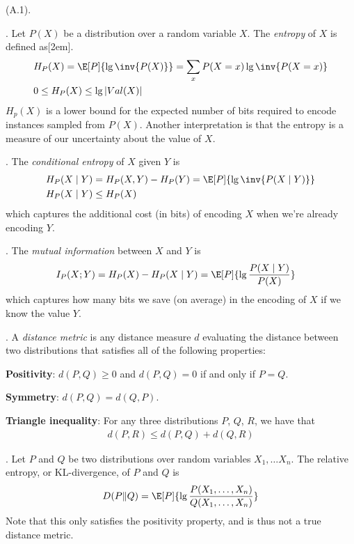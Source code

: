 \documentclass[11pt]{article}
\newcommand\p{\Needspace{10\baselineskip} \noindent}
\begin{document}
\p {} (A.1). 
\begin{compactitem}
	\item {}. Let $P(X)$ be a distribution over a random variable $X$. The \textit{entropy} of $X$ is defined as[2em]. 
	\begin{align}
		&H_P(X) = \E[P]{\lg \inv{P(X)}} = \sum_x P(X = x) \lg \inv{P(X = x)} \\
		&0 \le H_P(X) \le \lg|Val(X)|
	\end{align}
	$H_p(X)$ is a lower bound for the expected number of bits required to encode instances sampled from $P(X)$. Another interpretation is that the entropy is a measure of our uncertainty about the value of $X$. 
	
	\item {}. The \textit{conditional entropy} of $X$ given $Y$ is 
	\begin{align}
		H_P(X \mid Y) &= H_P(X, Y) - H_P(Y) = \E[P]{\lg \inv{P(X \mid Y)}} \\
		H_P(X \mid Y) &\le H_P(X)
	\end{align}
	which captures the additional cost (in bits) of encoding $X$ when we're already encoding $Y$. 
	
	\item {}. The \textit{mutual information} between $X$ and $Y$ is 
	\begin{align}
		I_P(X; Y) &= H_P(X) - H_P(X \mid Y) = \E[P]{\lg \frac{P(X\mid Y)}{ P(X) } }
	\end{align}
	which captures how many bits we save (on average) in the encoding of $X$ if we know the value $Y$. 
	
	\item {}. A \textit{distance metric} is any distance measure $d$ evaluating the distance between two distributions that satisfies all of the following properties:
	\begin{compactitem}
		\item \textbf{Positivity}: $d(P, Q) \ge 0$ and $d(P, Q) = 0$ if and only if $P = Q$. 
		\item \textbf{Symmetry}: $d(P, Q) = d(Q, P)$. 
		\item \textbf{Triangle inequality}: For any three distributions $P$, $Q$, $R$, we have that
		\begin{align}
			d(P, R) \le d(P, Q) + d(Q, R)
		\end{align}
	\end{compactitem}
	
	\item {}. Let $P$ and $Q$ be two distributions over random variables $X_1, \ldots X_n$. The relative entropy, or KL-divergence, of $P$ and $Q$ is 
	\begin{align}
		D(P \| Q) = \E[P]{\lg \frac{ P(X_1, \ldots, X_n ) }{ Q(X_1, \ldots, X_n) }  }
	\end{align}
	Note that this only satisfies the positivity property, and is thus not a true distance metric. 
\end{compactitem}
\end{document}
